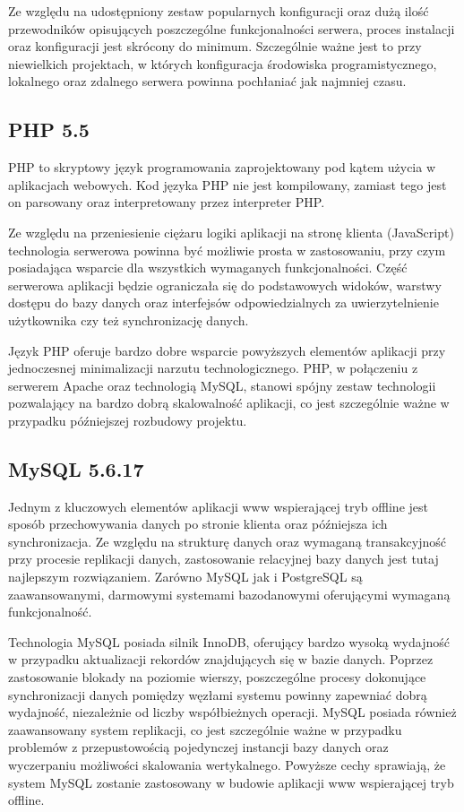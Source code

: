 Ze względu na udostępniony zestaw popularnych konfiguracji oraz dużą ilość przewodników opisujących poszczególne funkcjonalności serwera, proces instalacji oraz konfiguracji jest skrócony do minimum. Szczególnie ważne jest to przy niewielkich projektach, w których konfiguracja środowiska programistycznego, lokalnego oraz zdalnego serwera powinna pochłaniać jak najmniej czasu.

\subsection{PHP 5.5}
\label{sec:php}

PHP to skryptowy język programowania zaprojektowany pod kątem użycia w aplikacjach webowych. Kod języka PHP nie jest kompilowany, zamiast tego jest on parsowany oraz interpretowany przez interpreter PHP.

Ze względu na przeniesienie ciężaru logiki aplikacji na stronę klienta (JavaScript) technologia serwerowa powinna być możliwie prosta w zastosowaniu, przy czym posiadająca wsparcie dla wszystkich wymaganych funkcjonalności. Część serwerowa aplikacji będzie ograniczała się do podstawowych widoków, warstwy dostępu do bazy danych oraz interfejsów odpowiedzialnych za uwierzytelnienie użytkownika czy też synchronizację danych.

Język PHP oferuje bardzo dobre wsparcie powyższych elementów aplikacji przy jednoczesnej minimalizacji narzutu technologicznego. PHP, w połączeniu z serwerem Apache oraz technologią MySQL, stanowi spójny zestaw technologii pozwalający na bardzo dobrą skalowalność aplikacji, co jest szczególnie ważne w przypadku późniejszej rozbudowy projektu.

\subsection{MySQL 5.6.17}
\label{sec:mysql}

Jednym z kluczowych elementów aplikacji www wspierającej tryb offline jest sposób przechowywania danych po stronie klienta oraz późniejsza ich synchronizacja. Ze względu na strukturę danych oraz wymaganą transakcyjność przy procesie replikacji danych, zastosowanie relacyjnej bazy danych jest tutaj najlepszym rozwiązaniem. Zarówno MySQL jak i PostgreSQL są zaawansowanymi, darmowymi systemami bazodanowymi oferującymi wymaganą funkcjonalność.

Technologia MySQL posiada silnik InnoDB, oferujący bardzo wysoką wydajność w przypadku aktualizacji rekordów znajdujących się w bazie danych. Poprzez zastosowanie blokady na poziomie wierszy, poszczególne procesy dokonujące synchronizacji danych pomiędzy węzłami systemu powinny zapewniać dobrą wydajność, niezależnie od liczby współbieżnych operacji. MySQL posiada również zaawansowany system replikacji, co jest szczególnie ważne w przypadku problemów z przepustowością pojedynczej instancji bazy danych oraz wyczerpaniu możliwości skalowania wertykalnego. Powyższe cechy sprawiają, że system MySQL zostanie zastosowany w budowie aplikacji www wspierającej tryb offline.
